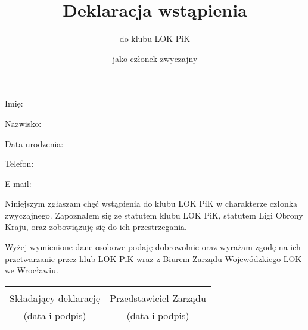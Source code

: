 \documentclass[a4paper,12pt]{article}
\title{Deklaracja wstąpienia}
\author{do klubu LOK PiK}
\date{jako członek zwyczajny}
\begin{document}
\maketitle
\thispagestyle{empty} %
Imię: \dotfill
\vspace{1em}

Nazwisko: \dotfill
\vspace{1em}

Data urodzenia: \dotfill
\vspace{1em}

Telefon: \dotfill
\vspace{1em}

E-mail: \dotfill
\vspace{1em}

Niniejszym zgłaszam chęć wstąpienia do klubu LOK PiK w charakterze członka zwyczajnego. Zapoznałem się ze statutem klubu LOK PiK, statutem Ligi Obrony Kraju, oraz zobowiązuję się do ich przestrzegania.

Wyżej wymienione dane osobowe podaję dobrowolnie oraz wyrażam zgodę na ich przetwarzanie przez klub LOK PiK wraz z Biurem Zarządu Wojewódzkiego LOK we Wrocławiu.
\vspace{4em}
\begin{center}
    \begin{tabular}{ c c }
        \dotfill & \dotfill \\
        Składający deklarację & Przedstawiciel Zarządu\\
        (data i podpis) & (data i podpis)
    \end{tabular}
\end{center}
\end{document}
